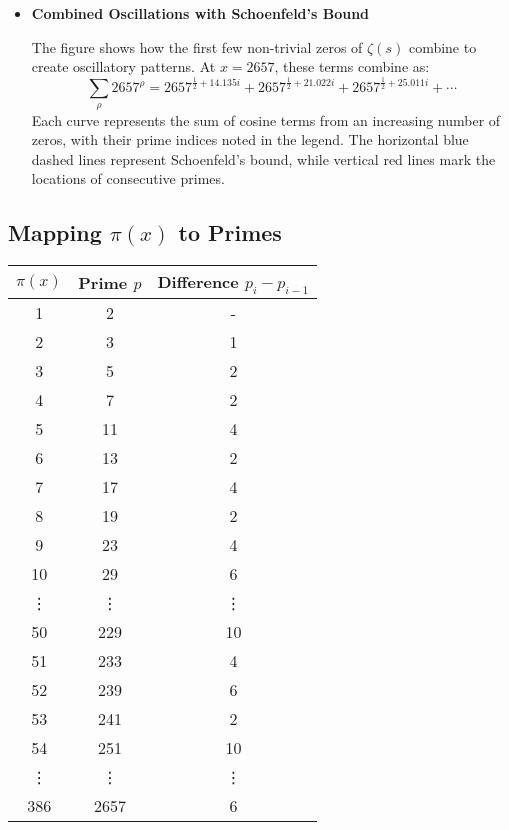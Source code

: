 \documentclass{article}
\begin{document}
\begin{itemize}
    \item \textbf{Combined Oscillations with Schoenfeld's Bound}
    \par
    The figure shows how the first few non-trivial zeros of $\zeta(s)$ combine to create oscillatory patterns. At $x = 2657$, these terms combine as:
    \[
    \sum_{\rho} 2657^{\rho} = 2657^{\frac{1}{2} + 14.135i} + 2657^{\frac{1}{2} + 21.022i} + 2657^{\frac{1}{2} + 25.011i} + \cdots
    \]
    Each curve represents the sum of cosine terms from an increasing number of zeros, with their prime indices noted in the legend. The horizontal blue dashed lines represent Schoenfeld's bound, while vertical red lines mark the locations of consecutive primes.
\end{itemize}

\subsection*{Mapping $\pi(x)$ to Primes}

\begin{center}
\begin{tabular}{ccc}
\toprule
\textbf{$\pi(x)$} & \textbf{Prime $p$} & \textbf{Difference $p_{i} - p_{i-1}$} \\
\midrule
1 & 2 & - \\
2 & 3 & 1 \\
3 & 5 & 2 \\
4 & 7 & 2 \\
5 & 11 & 4 \\
6 & 13 & 2 \\
7 & 17 & 4 \\
8 & 19 & 2 \\
9 & 23 & 4 \\
10 & 29 & 6 \\
\vdots & \vdots & \vdots \\
50 & 229 & 10 \\
51 & 233 & 4 \\
52 & 239 & 6 \\
53 & 241 & 2 \\
54 & 251 & 10 \\
\vdots & \vdots & \vdots \\
386 & 2657 & 6 \\
\bottomrule
\end{tabular}
\end{center}
\end{document}
